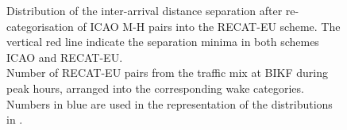 \begin{figure}[h]
    \centering
    
    
    
    \caption[Inter-arrival distance separation of ICAO M-H pairs into the RECAT-EU scheme]{\protect{} Distribution of the inter-arrival distance separation after re-categorisation of ICAO M-H pairs into the RECAT-EU scheme. The vertical red line indicate the separation minima in both schemes ICAO and RECAT-EU.\\ \protect{} Number of RECAT-EU pairs from the traffic mix at BIKF during peak hours, arranged into the corresponding wake categories. Numbers in blue are used in the representation of the distributions in \protect{}.}
    \label{fig:MH_to_RECAT_pairs_dist_separ}
\end{figure}

